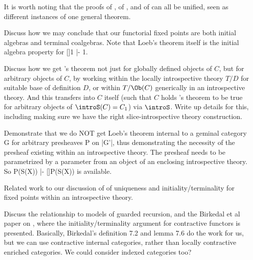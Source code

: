 
It is worth noting that the proofs of , of , and of  can all be unified, seen as different instances of one general theorem. 

\begin{TODOblock}
Discuss how we may conclude that our functorial fixed points are both initial algebras and terminal coalgebras. Note that Loeb's theorem itself is the initial algebra property for []1 |- 1.
\end{TODOblock}

\begin{TODOblock}
Discuss how we get \Loeb's theorem not just for globally defined objects of $C$, but for arbitrary objects of $C$, by working within the locally introspective theory $T/D$ for suitable base of definition $D$, or within $T/\Ob(C)$ generically in an introspective theory. And this transfers into $C$ itself (such that $C$ holds \Loeb's theorem to be true for arbitrary objects of $\introS(C) = C_1$) via $\introS$. Write up details for this, including making sure we have the right slice-introspective theory construction.
\end{TODOblock}

\begin{TODOblock}
Demonstrate that we do NOT get Loeb's theorem internal to a geminal category G for arbitrary presheaves P on |G'|, thus demonstrating the necessity of the presheaf existing within an introspective theory. The presheaf needs to be parametrized by a parameter from an object of an enclosing introspective theory. So P(S(X)) |- []P(S(X)) is available.
\end{TODOblock}

\begin{TODOblock}
Related work to our discussion of of uniqueness and initiality/terminality for fixed points within an introspective theory.

Discuss the relationship to models of guarded recursion, and the Birkedal et al paper on , where the initiality/terminality argument for contractive functors is presented. Basically, Birkedal's definition 7.2 and lemma 7.6 do the work for us, but we can use contractive internal categories, rather than locally contractive enriched categories. We could consider indexed categories too?
\end{TODOblock}

\fileend